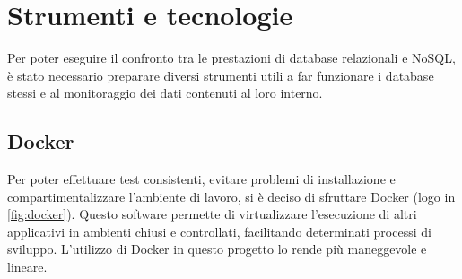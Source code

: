 
\chapter{Strumenti e tecnologie}
\label{cap:strumenti}


Per poter eseguire il confronto tra le prestazioni di database relazionali e NoSQL, è stato necessario preparare diversi strumenti utili a far funzionare i database stessi e al monitoraggio dei dati contenuti al loro interno.

\section{Docker}
Per poter effettuare test consistenti, evitare problemi di installazione e compartimentalizzare l'ambiente di lavoro, si è deciso di sfruttare Docker \cite{site:docker}\cite{site:dockerdocs} (logo in \autoref{fig:docker}). Questo software permette di virtualizzare l'esecuzione di altri applicativi in ambienti chiusi e controllati, facilitando determinati processi di sviluppo. L'utilizzo di Docker in questo progetto lo rende più maneggevole e lineare.\\

